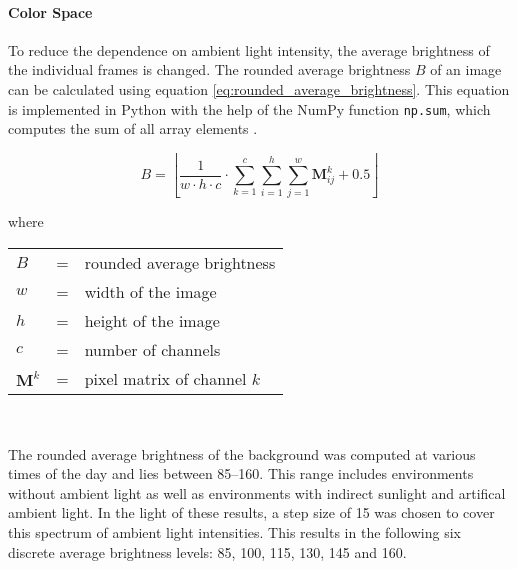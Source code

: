 \paragraph{Color Space}
To reduce the dependence on ambient light intensity, the average brightness of the individual frames is changed.
The rounded average brightness $B$ of an image can be calculated using equation \ref{eq:rounded_average_brightness}.
This equation is implemented in Python with the help of the NumPy function \texttt{np.sum}, which computes the sum of all array elements \cite{training_numpy_sum}.

\begin{equation}
  B = \left\lfloor\frac{1}{w\cdot h\cdot c} \cdot \sum\limits_{k=1}^c \sum\limits_{i=1}^h \sum\limits_{j=1}^w \boldsymbol{M}_{ij}^{k} + 0.5\right\rfloor
  \label{eq:rounded_average_brightness}
\end{equation}

where

\begin{tabular}{lll}
  $B$ & = & rounded average brightness \\
  $w$ & = & width of the image \\
  $h$ & = & height of the image \\
  $c$ & = & number of channels \\
  $\boldsymbol{M}^k$ & = & pixel matrix of channel $k$ \\
\end{tabular}
\\

\clearpage %

The rounded average brightness of the background was computed at various times of the day and lies between \numrange{85}{160}.
This range includes environments without ambient light as well as environments with indirect sunlight and artifical ambient light.
In the light of these results, a step size of \num{15} was chosen to cover this spectrum of ambient light intensities.
This results in the following six discrete average brightness levels: \num{85}, \num{100}, \num{115}, \num{130}, \num{145} and \num{160}.

